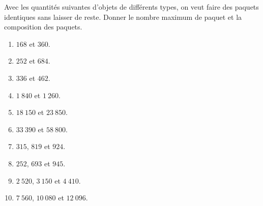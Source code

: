 \documentclass[14 pt]{extarticle}
\theoremstyle{plain}
\begin{document}
  Avec les quantités suivantes d'objets de différents types, on veut faire des paquets identiques sans laisser de reste. Donner le nombre maximum de paquet et la composition des paquets. 
  \begin{enumerate}
  
 \item $168$ et $360$. 
 \item $252$ et $684$. 
 \item $336$ et $462$. 
 \item $1~840$ et $1~260$. 
 \item $18~150$ et $23~850$. 
 \item $33~390$ et $58~800$. 
 \item $315$, $819$ et $924$. 
 \item $252$, $693$ et $945$. 
 \item $2~520$, $3~150$ et $4~410$. 
 \item $7~560$, $10~080$ et $12~096$. 
  \end{enumerate}
 	
\end{document}
